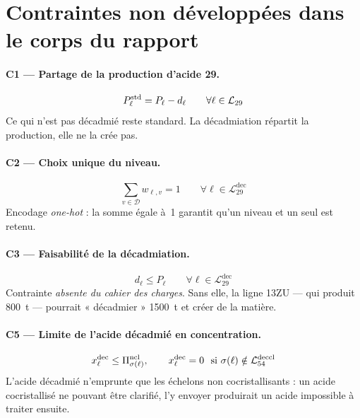 \section{Contraintes non développées dans le corps du rapport}

\paragraph{C1 --- Partage de la production d'acide 29.}
\begin{equation}
P^{\mathrm{std}}_\ell = P_\ell - d_\ell \qquad \forall \ell \in \mathcal{L}_{29}
\end{equation}
Ce qui n'est pas décadmié reste standard. La décadmiation répartit la production, elle ne
la crée pas.

\paragraph{C2 --- Choix unique du niveau.}
\begin{equation}
\sum_{v \in \mathcal{D}} w_{\ell,v} = 1 \qquad \forall \ell \in \mathcal{L}^{\mathrm{dec}}_{29}
\end{equation}
Encodage \emph{one-hot} : la somme égale à~1 garantit qu'un niveau et un seul est retenu.

\paragraph{C3 --- Faisabilité de la décadmiation.}
\begin{equation}
d_\ell \le P_\ell \qquad \forall \ell \in \mathcal{L}^{\mathrm{dec}}_{29}
\end{equation}
Contrainte \emph{absente du cahier des charges}. Sans elle, la ligne 13ZU --- qui produit
\SI{800}{\tonne} --- pourrait « décadmier » \SI{1500}{\tonne} et créer de la matière.

\paragraph{C5 --- Limite de l'acide décadmié en concentration.}
\begin{equation}
x^{\mathrm{dec}}_\ell \le \Pi^{\mathrm{ncl}}_{\sigma(\ell)}, \qquad
x^{\mathrm{dec}}_\ell = 0 \ \text{ si } \sigma(\ell) \notin \mathcal{L}^{\mathrm{deccl}}_{54}
\end{equation}
L'acide décadmié n'emprunte que les échelons non cocristallisants : un acide cocristallisé
ne pouvant être clarifié, l'y envoyer produirait un acide impossible à traiter ensuite.

